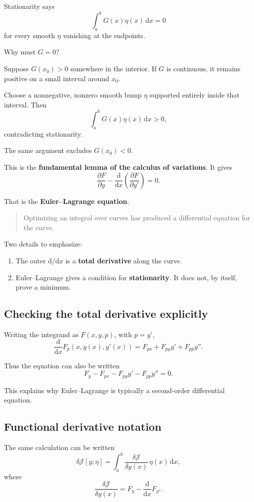 \documentclass[11pt,a4paper]{article}
\newcommand{\dd}{\mathrm{d}}
\newcommand{\J}{\mathcal{J}}
\begin{document}
Stationarity says
\[
\int_a^b G(x)\eta(x)\,\dd x=0
\]
for every smooth \(\eta\) vanishing at the endpoints.

Why must \(G=0\)?

Suppose \(G(x_0)>0\) somewhere in the interior.
If \(G\) is continuous, it remains positive on a small interval
around \(x_0\).

Choose a nonnegative, nonzero smooth bump \(\eta\) supported
entirely inside that interval. Then
\[
\int_a^b G(x)\eta(x)\,\dd x>0,
\]
contradicting stationarity.

The same argument excludes \(G(x_0)<0\).

This is the \textbf{fundamental lemma of the calculus of variations}.
It gives
\[
\boxed{
\frac{\partial F}{\partial y}
-
\frac{\dd}{\dd x}
\left(
\frac{\partial F}{\partial y'}
\right)
=0.
}
\]

That is the \textbf{Euler--Lagrange equation}.

\begin{quote}
Optimizing an integral over curves has produced a differential
equation for the curve.
\end{quote}

Two details to emphasize:
\begin{enumerate}
\item The outer \(\dd/\dd x\) is a \textbf{total derivative}
along the curve.
\item Euler--Lagrange gives a condition for \textbf{stationarity}.
It does not, by itself, prove a minimum.
\end{enumerate}

\subsection*{Checking the total derivative explicitly}

Writing the integrand as \(F(x,y,p)\), with \(p=y'\),
\[
\frac{\dd}{\dd x}F_p(x,y(x),y'(x))
=
F_{px}+F_{py}y'+F_{pp}y''.
\]

Thus the equation can also be written
\[
F_y-F_{px}-F_{py}y'-F_{pp}y''=0.
\]

This explains why Euler--Lagrange is typically a second-order
differential equation.

\subsection*{Functional derivative notation}

The same calculation can be written
\[
\delta\J[y;\eta]
=
\int_a^b
\frac{\delta\J}{\delta y(x)}
\,\eta(x)\,\dd x,
\]
where
\[
\boxed{
\frac{\delta\J}{\delta y(x)}
=
F_y-\frac{\dd}{\dd x}F_{y'}.
}
\]
\end{document}
